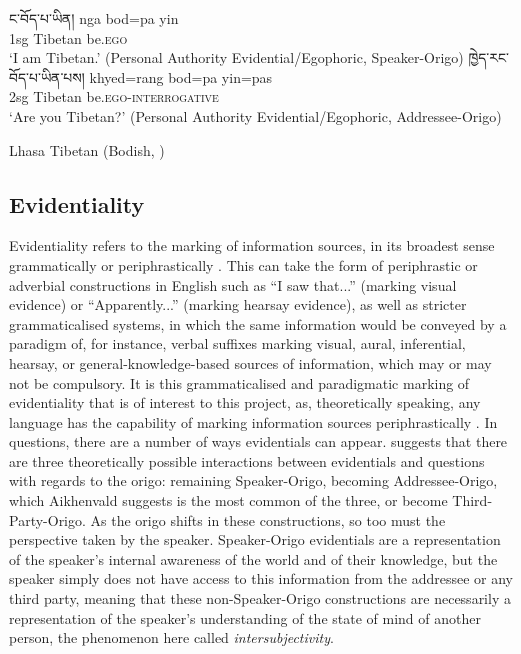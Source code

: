\begin{exe}
\ex\label{ex:OrigoShift}
\begin{xlist}
\ex\label{ex:OrigoShift:a} \texttibetan{ང་བོད་པ་ཡིན།}
\gll nga bod=pa yin \\
1sg Tibetan be.\textsc{ego} \\
\glt `I am Tibetan.' (Personal Authority Evidential/Egophoric, Speaker-Origo)
\ex\label{ex:OrigoShift:b} \texttibetan{ཁྱེད་རང་བོད་པ་ཡིན་པས།}
\gll khyed=rang bod=pa yin=pas \\
2sg Tibetan be.\textsc{ego}-\textsc{interrogative} \\
\glt `Are you Tibetan?' (Personal Authority Evidential/Egophoric, Addressee-Origo)
\end{xlist}
Lhasa Tibetan (Bodish, \tibetnat) \cite[394]{DeLancey2017Tibetan}
\end{exe}


\subsection{Evidentiality}\label{s:Intro:EvidentialityIntro}
Evidentiality refers to the marking of information sources, in its broadest sense grammatically or periphrastically \cite{SanRoque2019Evidentiality}. This can take the form of periphrastic or adverbial constructions in English such as ``I saw that...'' (marking visual evidence) or ``Apparently...'' (marking hearsay evidence), as well as stricter grammaticalised systems, in which the same information would be conveyed by a paradigm of, for instance, verbal suffixes marking visual, aural, inferential, hearsay, or general-knowledge-based sources of information, which may or may not be compulsory. It is this grammaticalised and paradigmatic marking of evidentiality that is of interest to this project, as, theoretically speaking, any language has the capability of marking information sources periphrastically \cite{SanRoque2019Evidentiality}. In questions, there are a number of ways evidentials can appear.  suggests that there are three theoretically possible interactions between evidentials and questions with regards to the origo: remaining Speaker-Origo, becoming Addressee-Origo, which Aikhenvald suggests is the most common of the three, or become Third-Party-Origo. As the origo shifts in these constructions, so too must the perspective taken by the speaker. Speaker-Origo evidentials are a representation of the speaker's internal awareness of the world and of their knowledge, but the speaker simply does not have access to this information from the addressee or any third party, meaning that these non-Speaker-Origo constructions are necessarily a representation of the speaker's understanding of the state of mind of another person, the phenomenon here called \textit{intersubjectivity}.



